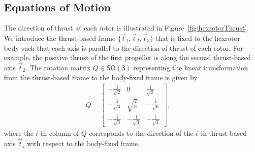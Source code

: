 \documentclass[twocolumn,letterpaper]{IEEEAerospaceCLS}  %
\newcommand{\SO}{\ensuremath{\mathsf{SO(3)}}}
\begin{document}
\subsection{Equations of Motion}

The direction of thrust at each rotor is illustrated in Figure~\ref{fig:hexrotorThrust}.
We introduce the thrust-based frame $\{\vec t_1,\vec t_2,\vec t_3\}$ that is fixed to the hexrotor body such that each axis is parallel to the direction of thrust of each rotor. For example, the positive thrust of the first propeller is along the second thrust-based axis $\vec t_2$. The rotation matrix $Q\in\SO$ representing the linear transformation from the thrust-based frame to the body-fixed frame is given by
%
\begin{align}
\label{eqn:Q}
Q=\begin{bmatrix}
-\frac{1}{\sqrt2} & 0 & \frac{1}{\sqrt2}\\
-\frac{1}{\sqrt6} & \sqrt{\frac{2}{3}} & -\frac{1}{\sqrt6}\\
-\frac{1}{\sqrt3} & -\frac{1}{\sqrt3} & -\frac{1}{\sqrt3}
\end{bmatrix},
\end{align}
where the $i$-th column of $Q$ corresponds to the direction of the $i$-th thrust-based axis $\vec t_i$ with respect to the body-fixed frame. 
\end{document}

